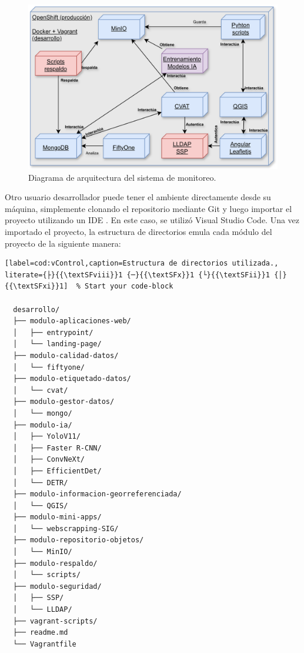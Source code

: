 \begin{figure}[htpb]
  \centering
  \includegraphics[scale=0.09]{./Figures/herramientas-plataforma.png}
  \caption{Diagrama de arquitectura del sistema de monitoreo.}
  \label{fig:infra-desarrollo}
\end{figure}

Otro usuario desarrollador puede tener el ambiente directamente desde su máquina, simplemente clonando el repositorio \citep{bruno_masoller_brunomaso1uba-ceia_nodate} mediante Git y luego importar el proyecto utilizando un IDE \citep{wikipedia_entorno_2025}. En este caso, se utilizó Visual Studio Code. Una vez importado el proyecto, la estructura de directorios emula cada módulo del proyecto de la siguiente manera:


%
%

%
%

\begin{lstlisting}[label=cod:vControl,caption=Estructura de directorios utilizada., literate={├}{{\textSFviii}}1 {─}{{\textSFx}}1 {└}{{\textSFii}}1 {│}{{\textSFxi}}1]  % Start your code-block

  desarrollo/
  ├── modulo-aplicaciones-web/
  │   ├── entrypoint/
  │   └── landing-page/
  ├── modulo-calidad-datos/
  │   └── fiftyone/
  ├── modulo-etiquetado-datos/
  │   └── cvat/
  ├── modulo-gestor-datos/
  │   └── mongo/
  ├── modulo-ia/
  │   ├── YoloV11/
  │   ├── Faster R-CNN/
  │   ├── ConvNeXt/
  │   ├── EfficientDet/
  │   └── DETR/
  ├── modulo-informacion-georreferenciada/
  │   └── QGIS/
  ├── modulo-mini-apps/
  │   └── webscrapping-SIG/
  ├── modulo-repositorio-objetos/
  │   └── MinIO/
  ├── modulo-respaldo/
  │   └── scripts/
  ├── modulo-seguridad/
  │   ├── SSP/
  │   └── LLDAP/
  ├── vagrant-scripts/
  ├── readme.md
  └── Vagrantfile

\end{lstlisting}

